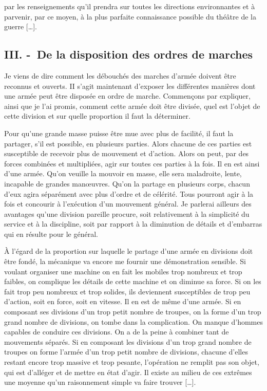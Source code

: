 \documentclass[french,twoside]{book} %
\begin{document}
par les renseignements qu’il prendra sur toutes les directions environnantes et à parvenir, par ce moyen, à la plus parfaite connaissance possible du théâtre de la guerre […].
\subsection[{III. - De la disposition des ordres de marches}]{III. - De la disposition des ordres de marches}
\noindent Je viens de dire comment les débouchés des marches d’armée doivent être reconnus et ouverts. II s’agit maintenant d’exposer les différentes manières dont une armée peut être disposée en ordre de marche. Commençons par expliquer, ainsi que je l’ai promis, comment cette armée doit être divisée, quel est l’objet de cette division et sur quelle proportion il faut la déterminer.\par
Pour qu’une grande masse puisse être mue avec plus de facilité, il faut la partager, s’il est possible, en plusieurs parties. Alors chacune de ces parties est susceptible de recevoir plus de mouvement et d’action. Alors on peut, par des forces combinées et multipliées, agir sur toutes ces parties à la fois. Il en est ainsi d’une armée. Qu’on veuille la mouvoir en masse, elle sera maladroite, lente, incapable de grandes manœuvres. Qu’on la partage en plusieurs corps, chacun d’eux agira séparément avec plus d’ordre et de célérité. Tous pourront agir à la fois et concourir à l’exécution d’un mouvement général. Je parlerai ailleurs des avantages qu’une division pareille procure, soit relativement à la simplicité du service et à la discipline, soit par rapport à la diminution de détails et d’embarras qui en résulte pour le général.\par
À l’égard de la proportion sur laquelle le partage d’une armée en divisions doit être fondé, la mécanique va encore me fournir une démonstration sensible. Si voulant organiser une machine on en fait les mobiles trop nombreux et trop faibles, on complique les détails de cette machine et on diminue sa force. Si on les fait trop peu nombreux et trop solides, ils deviennent susceptibles de trop peu d’action, soit en force, soit en vitesse. Il en est de même d’une armée. Si en composant ses divisions d’un trop petit nombre de troupes, on la forme d’un trop grand nombre de divisions, on tombe dans la complication. On manque d’hommes capables de conduire ces divisions. On a de la peine à combiner tant de mouvements séparés. Si en composant les divisions d’un trop grand nombre de troupes on forme l’armée d’un trop petit nombre de divisions, chacune d’elles restant encore trop massive et trop pesante, l’opération ne remplit pas son objet, qui est d’alléger et de mettre en état d’agir. Il existe au milieu de ces extrêmes une moyenne qu’un raisonnement simple va faire trouver […].\par
\end{document}
